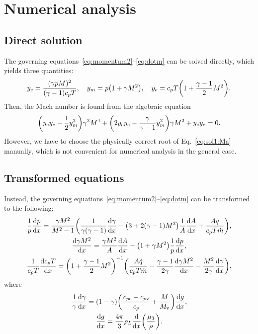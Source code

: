 \documentclass{article}
\newcommand{\vap}{\text{v}}
\newcommand{\con}{\text{c}}
\begin{document}
\section{Numerical analysis}

\subsection{Direct solution}

The governing equations~\eqref{eq:momentum2}--\eqref{eq:dotm} can be solved directly, which yields three quantities:
\begin{equation}\label{eq:sol1:y}
    y_c = \frac{(\gamma pM)^2}{(\gamma-1)c_pT}, \quad
    y_m = p\qty(1 + \gamma M^2), \quad
    y_e = c_pT\qty(1 + \frac{\gamma-1}{2}M^2).
\end{equation}
Then, the Mach number is found from the algebraic equation
\begin{equation}\label{eq:sol1:Ma}
    \qty(y_c y_e - \frac12y_m^2)\gamma^2M^4 + \qty(2y_c y_e - \frac{\gamma}{\gamma-1}y_m^2)\gamma M^2 + y_cy_e = 0.
\end{equation}
However, we have to choose the physically correct root of Eq.~\eqref{eq:sol1:Ma} manually,
which is not convenient for numerical analysis in the general case.

\subsection{Transformed equations}

Instead, the governing equations~\eqref{eq:momentum2}--\eqref{eq:dotm} can be transformed to the following:
\begin{gather}
    \frac1p\dv{p}{x} = \frac{\gamma M^2}{M^2 - 1}
        \qty( \frac1{\gamma(\gamma-1)}\dv{\gamma}{x} - \qty(3 + 2(\gamma-1)M^2)\frac1A\dv{A}{x}
            + \frac{A\dot{q}}{c_pT\dot{m}}), \label{eq:sol2:p}\\
    \dv{\gamma M^2}{x} =
        \frac{\gamma M^2}{A}\dv{A}{x} - \qty(1 + \gamma M^2)\frac1p\dv{p}{x}, \label{eq:sol2:Ma}\\
    \frac1{c_pT}\dv{c_pT}{x} = \qty(1+\frac{\gamma-1}{2}M^2)^{-1}
        \qty(\frac{A\dot{q}}{c_pT\dot{m}} - \frac{\gamma-1}{2\gamma}\dv{\gamma M^2}{x}
            - \frac{M^2}{2\gamma}\dv{\gamma}{x}), \label{eq:sol2:T}
\end{gather}
where
\begin{gather}
    \frac1\gamma\dv{\gamma}{x}
        = (1-\gamma)\qty(\frac{c_{p\con} - c_{p\vap}}{c_p} + \frac{\bar{M}}{M_\vap})\dv{g}{x}, \label{eq:gamma_prime}\\
    \dv{g}{x} = \frac{4\pi}{3}\rho_L\dv{x}(\frac{\mu_3}{\rho}). \label{eq:g_prime}
\end{gather}

\printbibliography
\end{document}
